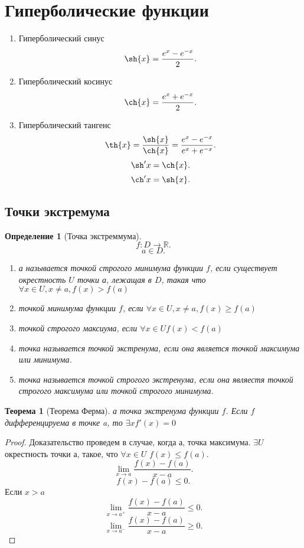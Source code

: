 \documentclass[a4paper]{scrartcl}
\newtheorem{theorem}{Теорема}
\newtheorem{definition}{Определение}
\begin{document}
\section{Гиперболические функции}
\begin{enumerate}
    \item Гиперболический синус
        \[
            \sh{x} = \frac{e^x - e^{-x}}{2}
        .\] 
    \item Гиперболический косинус
        \[
            \ch{x} = \frac{e^x + e^{-x}}{2}
        .\] 
    \item Гиперболический тангенс
        \[
            \th{x} = \frac{\sh{x}}{\ch{x}} = \frac{e^x  - e^{ -x }}{e^x + e^{ -x }}
        .\] 
    \[
        \sh'{x} = \ch{x}
    .\] 
    \[
        \ch'{x}  = \sh{x}
    .\] 
\end{enumerate}
\subsection{Точки экстремума}
\begin{definition}[Точка экстреммума]
    \[
    f: D \to \mathbb{R}
    .\] 
    \[
    a \in D
    .\] 
    \begin{enumerate}
        \item 
    а называется точкой строгого минимума функции $f$, если существует окрестность $U$ точки а, лежащая в $D$, такая что  $\forall  x \in U, x\neq a, f(x) > f(a)$
\item  точкой минимума функции $f$, если  $\forall  x \in U, x\neq a, f(x) \ge  f(a)$
\item точкой строгого максиума, если $\forall x 
    \in U f(x) < f(a)$
\item 
    точка называется точкой экстренума, если она является точкой максимума или минимума.
    \item
        точка называется точкой строгого экстренума, если она являестя точкой строгого максимума или точкой строгого минимума.
    \end{enumerate}
\end{definition}
\begin{theorem}[Теорема Ферма]
    а точка экстренума функции $f$. Если  $f$ дифференцируема в точке a, то  $\exists  x f'(x) = 0$
\end{theorem}
\begin{proof}
    Доказательство проведем в случае, когда а, точка максимума. $\exists U$ окрестность точки а, такое, что $\forall  x  \in U$ $f(x) \le  f(a)$.
     \[
    \lim_{x \to a} \frac{f(x)  -f(a)}{x  -a}
    .\] 
    \[
    f(x) - f(a) \le  0
    .\] 
    Если $x > a$
     \[
         \lim_{x \to a^+} \frac{f(x) -f(a)}{x - a} \le  0
    .\] 
    \[
    \lim_{x \to a^-} \frac{f(x) - f(a)}{x - a} \ge  0
    .\] 
\end{proof}
\end{document}
